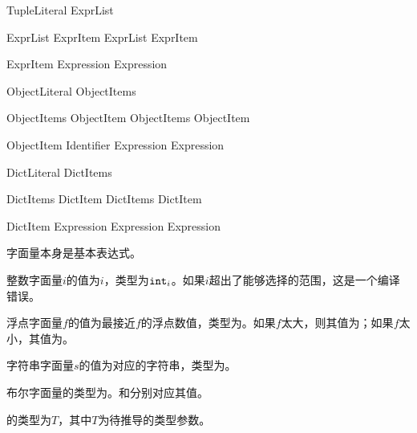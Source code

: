\begin{bnf}{TupleLiteral}
    \terminal{(} ExprList\bnfq \terminal{)}
\end{bnf}

\begin{bnf}{ExprList}
    ExprItem \br
    ExprList \terminal{,} ExprItem
\end{bnf}

\begin{bnf}{ExprItem}
    Expression \br
     Expression
\end{bnf}

\begin{bnf}{ObjectLiteral}
    \terminal{\{} ObjectItems\bnfq \terminal{\}}
\end{bnf}

\begin{bnf}{ObjectItems}
    ObjectItem \br
    ObjectItems \terminal{,} ObjectItem
\end{bnf}

\begin{bnf}{ObjectItem}
    Identifier \terminal{:} Expression \br
     Expression
\end{bnf}

\begin{bnf}{DictLiteral}
    \terminal{\{|} DictItems\bnfq \terminal{|\}}
\end{bnf}

\begin{bnf}{DictItems}
    DictItem \br
    DictItems \terminal{,} DictItem
\end{bnf}

\begin{bnf}{DictItem}
    Expression \terminal{:} Expression \br
     Expression
\end{bnf}

\pnum
字面量本身是基本表达式。

\pnum
整数字面量$i$的值为$i$，类型为$\texttt{int}_i$。如果$i$超出了能够选择的范围，这是一个编译错误。

\pnum
浮点字面量$f$的值为最接近$f$的浮点数值，类型为。如果$f$太大，则其值为；如果$f$太小，其值为。

\pnum
字符串字面量$s$的值为对应的字符串，类型为。

\pnum
布尔字面量的类型为。和分别对应其值。

\pnum
{}的类型为$T$，其中$T$为待推导的类型参数。

